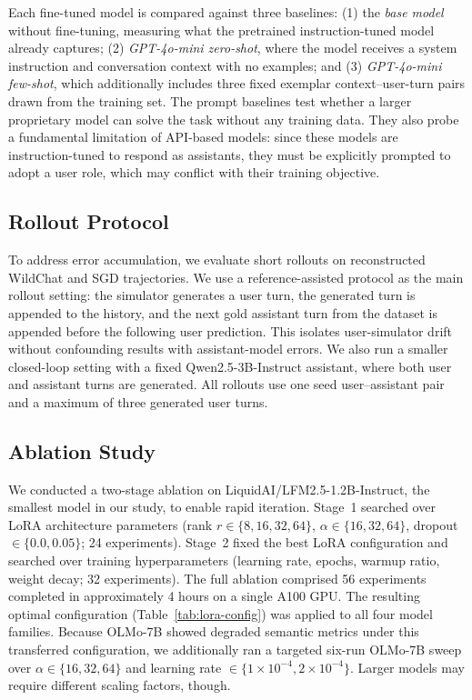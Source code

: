 \documentclass[conference]{IEEEtran}
\begin{document}
Each fine-tuned model is compared against three baselines: (1) the \emph{base model} without fine-tuning, measuring what the pretrained instruction-tuned model already captures; (2) \emph{GPT-4o-mini zero-shot}, where the model receives a system instruction and conversation context with no examples; and (3) \emph{GPT-4o-mini few-shot}, which additionally includes three fixed exemplar context--user-turn pairs drawn from the training set. The prompt baselines test whether a larger proprietary model can solve the task without any training data. They also probe a fundamental limitation of API-based models: since these models are instruction-tuned to respond as assistants, they must be explicitly prompted to adopt a user role, which may conflict with their training objective.

\subsection{Rollout Protocol}

To address error accumulation, we evaluate short rollouts on reconstructed WildChat and SGD trajectories. We use a reference-assisted protocol as the main rollout setting: the simulator generates a user turn, the generated turn is appended to the history, and the next gold assistant turn from the dataset is appended before the following user prediction. This isolates user-simulator drift without confounding results with assistant-model errors. We also run a smaller closed-loop setting with a fixed Qwen2.5-3B-Instruct assistant, where both user and assistant turns are generated. All rollouts use one seed user--assistant pair and a maximum of three generated user turns.


\subsection{Ablation Study}\label{sec:ablation}

We conducted a two-stage ablation on LiquidAI/LFM2.5-1.2B-Instruct, the smallest model in our study, to enable rapid iteration. Stage~1 searched over LoRA architecture parameters (rank $r \in \{8, 16, 32, 64\}$, $\alpha \in \{16, 32, 64\}$, dropout $\in \{0.0, 0.05\}$; 24 experiments). Stage~2 fixed the best LoRA configuration and searched over training hyperparameters (learning rate, epochs, warmup ratio, weight decay; 32 experiments). The full ablation comprised 56 experiments completed in approximately 4 hours on a single A100 GPU. The resulting optimal configuration (Table~\ref{tab:lora-config}) was applied to all four model families. Because OLMo-7B showed degraded semantic metrics under this transferred configuration, we additionally ran a targeted six-run OLMo-7B sweep over $\alpha \in \{16,32,64\}$ and learning rate $\in \{1{\times}10^{-4},2{\times}10^{-4}\}$. Larger models may require different scaling factors, though.
\end{document}
